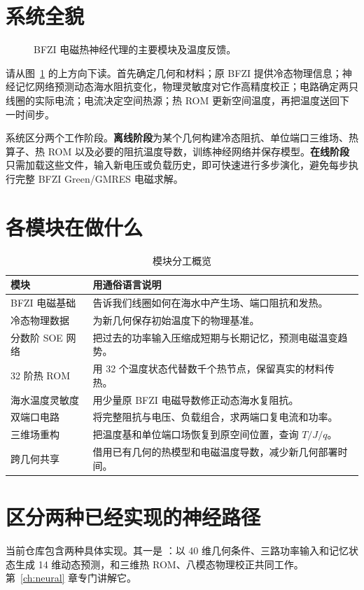 \section{系统全貌}
\begin{figure}[htbp]
\centering\resizebox{\textwidth}{!}{}
\caption{BFZI 电磁热神经代理的主要模块及温度反馈。}
\label{fig:system}
\end{figure}
请从图~\ref{fig:system} 的上方向下读。首先确定几何和材料；原 BFZI 提供冷态物理信息；神经记忆网络预测动态海水阻抗变化，物理灵敏度对它作高精度校正；电路确定两只线圈的实际电流；电流决定空间热源；热 ROM 更新空间温度，再把温度送回下一时间步。

系统区分两个工作阶段。\textbf{离线阶段}为某个几何构建冷态阻抗、单位端口三维场、热算子、热 ROM 以及必要的阻抗温度导数，训练神经网络并保存模型。\textbf{在线阶段}只需加载这些文件，输入新电压或负载历史，即可快速进行多步演化，避免每步执行完整 BFZI Green/GMRES 电磁求解。

\section{各模块在做什么}
\begin{table}[htbp]\centering\small
\caption{模块分工概览}
\begin{tabularx}{\textwidth}{p{3.3cm}X}
\toprule
模块 & 用通俗语言说明 \\
\midrule
BFZI 电磁基础 & 告诉我们线圈如何在海水中产生场、端口阻抗和发热。\\
冷态物理数据 & 为新几何保存初始温度下的物理基准。\\
分数阶 SOE 网络 & 把过去的功率输入压缩成短期与长期记忆，预测电磁温变趋势。\\
32 阶热 ROM & 用 32 个温度状态代替数千个热节点，保留真实的材料传热。\\
海水温度灵敏度 & 用少量原 BFZI 电磁导数修正动态海水复阻抗。\\
双端口电路 & 将完整阻抗与电压、负载组合，求两端口复电流和功率。\\
三维场重构 & 把温度基和单位端口场恢复到原空间位置，查询 $T/J/q$。\\
跨几何共享 & 借用已有几何的热模型和电磁温度导数，减少新几何部署时间。\\
\bottomrule
\end{tabularx}
\end{table}

\section{区分两种已经实现的神经路径}
当前仓库包含两种具体实现。其一是 ：以 40 维几何条件、三路功率输入和记忆状态生成 14 维动态预测，和三维热 ROM、八模态物理校正共同工作。第~\ref{ch:neural} 章专门讲解它。

